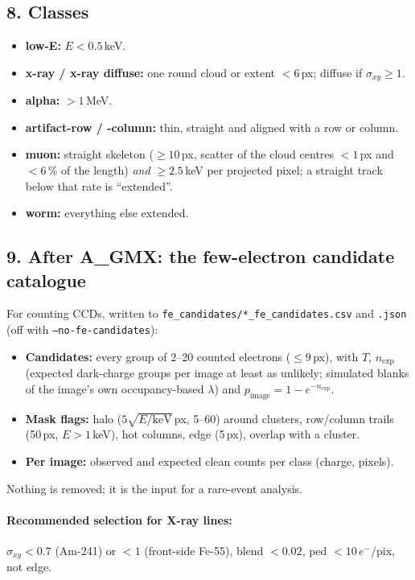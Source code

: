 \documentclass[10pt,a4paper]{article}
\newcommand{\el}{\ensuremath{e^-}}
\newcommand{\code}[1]{\texttt{#1}}
\begin{document}
\subsection*{8. Classes}
\begin{itemize}
\item \textbf{low-E:} $E<0.5$\,keV.
\item \textbf{x-ray / x-ray diffuse:} one round cloud or extent $<6$\,px; diffuse if $\sigma_{xy}\ge1$.
\item \textbf{alpha:} $>1$\,MeV.
\item \textbf{artifact-row / -column:} thin, straight and aligned with a row or column.
\item \textbf{muon:} straight skeleton ($\ge10$\,px, scatter of the cloud centres $<1$\,px and $<6\,\%$ of the
length) \emph{and} $\ge2.5$\,keV per projected pixel; a straight track below that rate is ``extended''.
\item \textbf{worm:} everything else extended.
\end{itemize}

\subsection*{9. After A\_GMX: the few-electron candidate catalogue}
For counting CCDs, written to \code{fe\_candidates/*\_fe\_candidates.csv} and \code{.json} (off with
\code{--no-fe-candidates}):
\begin{itemize}
\item \textbf{Candidates:} every group of 2--20 counted electrons ($\le9$\,px), with $T$, $n_\mathrm{exp}$ (expected
dark-charge groups per image at least as unlikely; simulated blanks of the image's own occupancy-based $\lambda$) and
$p_\mathrm{image}=1-e^{-n_\mathrm{exp}}$.
\item \textbf{Mask flags:} halo ($5\sqrt{E/\mathrm{keV}}$\,px, 5--60) around clusters, row/column trails (50\,px,
$E>1$\,keV), hot columns, edge (5\,px), overlap with a cluster.
\item \textbf{Per image:} observed and expected clean counts per class (charge, pixels).
\end{itemize}
Nothing is removed; it is the input for a rare-event analysis.

\paragraph{Recommended selection for X-ray lines:} $\sigma_{xy}<0.7$ (Am-241) or $<1$ (front-side Fe-55), blend
$<0.02$, ped $<10$\,\el/pix, not edge.
\end{document}
